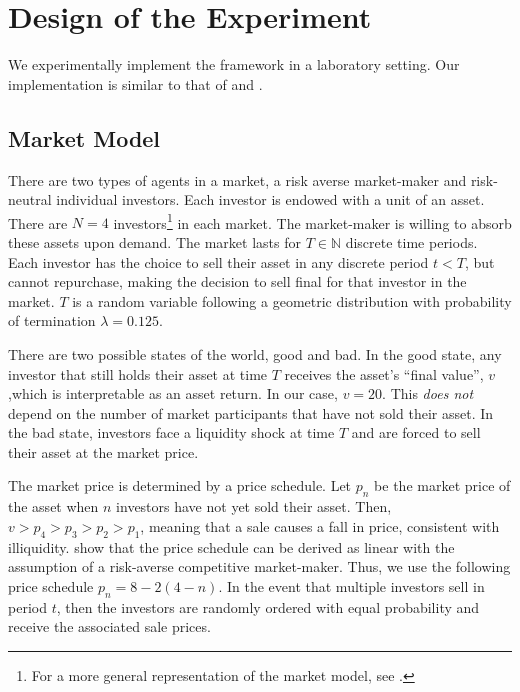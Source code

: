 \documentclass[11pt]{article}
\begin{document}









\section{Design of the Experiment}
We experimentally implement the \cite{bernardo2004liquidity} framework in a laboratory setting. Our implementation is similar to that of \cite{magnani2020dynamic} and \cite{choi2022market}.

\subsection{Market Model} \label{sec:market model}
There are two types of agents in a market, a risk averse market-maker and risk-neutral individual investors. Each investor is endowed with a unit of an asset. There are $N=4$ investors\footnote{For a more general representation of the market model, see \cite{magnani2020dynamic}.} in each market. The market-maker is willing to absorb these assets upon demand. The market lasts for $T \in \mathbb{N}$ discrete time periods. Each investor has the choice to sell their asset in any discrete period $t < T$, but cannot repurchase, making the decision to sell final for that investor in the market. $T$ is a random variable following a geometric distribution with probability of termination $\lambda = 0.125$.

There are two possible states of the world, good and bad. In the good state, any investor that still holds their asset at time $T$ receives the asset's ``final value'', $v$ ,which is interpretable as an asset return. In our case, $v=20$. This \textit{does not} depend on the number of market participants that have not sold their asset. In the bad state, investors face a liquidity shock at time $T$ and are forced to sell their asset at the market price.

The market price is determined by a price schedule. Let $p_n$ be the market price of the asset when $n$ investors have not yet sold their asset. Then, $ v > p_4 > p_3 > p_2 > p_1$, meaning that a sale causes a fall in price, consistent with illiquidity. \cite{bernardo2004liquidity} show that the price schedule can be derived as linear with the assumption of a risk-averse competitive market-maker. Thus, we use the following price schedule $p_n = 8 - 2(4-n)$. In the event that multiple investors sell in period $t$, then the investors are randomly ordered with equal probability and receive the associated sale prices.
\end{document}
